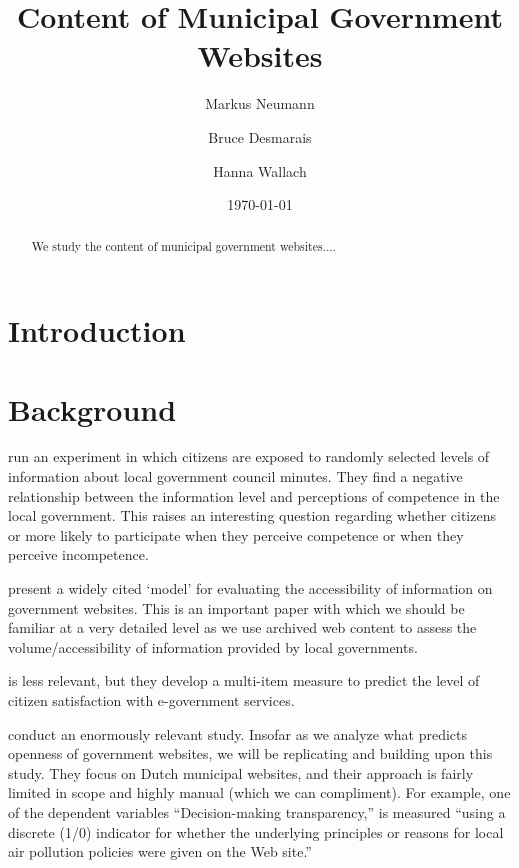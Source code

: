 \documentclass[11pt]{article}
\title{\vspace{-2cm} Content of Municipal Government Websites }
\author{ Markus Neumann \and Bruce Desmarais \and Hanna Wallach} \date{\today}
\begin{document}
\maketitle




\begin{abstract}

\noindent We study the content of municipal government websites....

\end{abstract}
\thispagestyle{empty}
\section{Introduction}

\section{Background}

\cite{grimmelikhuijsen2010transparency} run an experiment in which citizens are exposed to randomly selected levels of information about local government council minutes. They find a negative relationship between the information level and perceptions of competence in the local government. This raises an interesting question regarding whether citizens or more likely to participate when they perceive competence or when they perceive incompetence.

\cite{wang2005evaluating} present a widely cited `model' for evaluating the accessibility of information on government websites. This is an important paper with which we should be familiar at a very detailed level as we use archived web content to assess the volume/accessibility of information provided by local governments.

\cite{osman2014cobra} is less relevant, but they develop a multi-item measure to predict the level of citizen satisfaction with e-government services. 


\cite{grimmelikhuijsen2012developing} conduct an enormously relevant study. Insofar as we analyze what predicts openness of government websites, we will be replicating and building upon this study. They focus on Dutch municipal websites, and their approach is fairly limited in scope and highly manual (which we can compliment). For example, one of the dependent variables ``Decision-making transparency,'' is measured ``using a discrete (1/0) indicator for whether the underlying principles or reasons for local air pollution policies were given on the Web site.'' 
\end{document}

